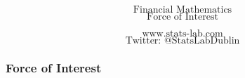 \documentclass{beamer}
\begin{document}
\begin{frame}
\Huge
\[\mbox{Financial Mathematics}\]
\LARGE
\[\mbox{Force of Interest}\]

\Large
\[\mbox{www.stats-lab.com}\]
\[\mbox{Twitter: @StatsLabDublin}\]

\end{frame}


\begin{frame}
\frametitle{Force of Interest}
\Large


\end{frame}
\end{document}
